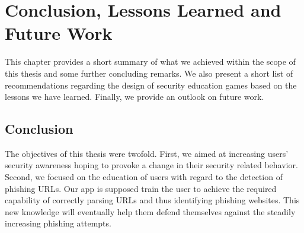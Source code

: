 
\section{Conclusion, Lessons Learned and Future Work}
\label{s:conclusion}

This chapter provides a short summary of what we achieved within the scope of this thesis and some further concluding remarks.
We also present a short list of recommendations regarding the design of security education games based on the lessons we have learned.
Finally, we provide an outlook on future work.
\subsection{Conclusion}
The objectives of this thesis were twofold.
First, we aimed at increasing users' security awareness hoping to provoke a change in their security related behavior.
Second, we focused on the education of users with regard to the detection of phishing URLs. 
Our app is supposed train the user to achieve the required capability of correctly parsing URLs and thus identifying phishing websites.
This new knowledge will eventually help them defend themselves against the steadily increasing phishing attempts.


